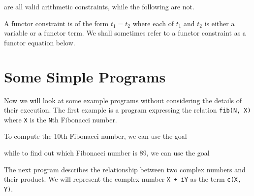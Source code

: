 
\noindent
are all valid arithmetic constraints, while the following are not.


\noindent
A functor constraint is of the form $t_1 = t_2$ where
each of $t_1$ and $t_2$ is either a variable or a functor term.
We shall sometimes refer to a functor constraint as a functor equation below.

\section{Some Simple Programs}

Now we will look at some example programs without considering 
the details of their execution.
The first example is a program expressing the relation {\tt fib(N, X)} where 
{\tt X} is the {\tt N}th Fibonacci number. 


\noindent
To compute the 10th Fibonacci number, 
we can use the goal


\noindent
while to find out which Fibonacci number is 89, we can use the goal


\noindent
The next program describes the relationship between two complex numbers and
their product. We will represent the complex number {\tt X + iY} as 
the term {\tt c(X, Y)}.


